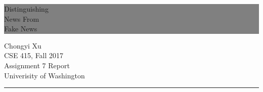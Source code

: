 \documentclass[twoside,twocolumn]{article}
\begin{document}
    \begin{titlepage}
        
        
        \colorbox{grey}{
            \parbox[t]{0.93\textwidth}{ %
                \parbox[t]{0.91\textwidth}{ %
                    \raggedleft %
                    \fontsize{40pt}{80pt}\selectfont %
                    \vspace{0.7cm} %
                    Distinguishing\\
                    News From\\
                    Fake News\\
                    \vspace{0.7cm} %
                }
            }
        }
        
        \vfill %
        
        
        \parbox[t]{0.93\textwidth}{ %
            \raggedleft %
            \large %
            {\Large Chongyi Xu}\\[4pt] %
            CSE 415, Fall 2017\\
            Assignment 7 Report\\
            Univerisity of Washington\\[4pt] %
            
            \hfill\rule{0.2\linewidth}{1pt}%
        }
        
    \end{titlepage}

\end{document}
